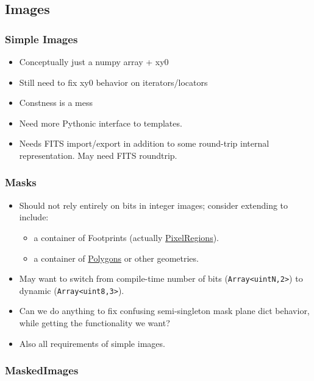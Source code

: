 \subsection{Images}
\label{sec:spImages}

\subsubsection{Simple Images}
\label{sec:spImagesSimple}

\begin{itemize}
\item Conceptually just a numpy array + xy0
\item Still need to fix xy0 behavior on iterators/locators
\item Constness is a mess
\item Need more Pythonic interface to templates.
\item Needs FITS import/export in addition to some round-trip internal representation.  May need FITS roundtrip.
\end{itemize}

\subsubsection{Masks}
\label{sec:spImagesMasks}

\begin{itemize}
\item Should not rely entirely on bits in integer images; consider extending to include:
    \begin{itemize}
    \item a container of Footprints (actually \hyperref[sec:spFootprintsPixelRegions]{PixelRegions}).
    \item a container of \hyperref[sec:spCartesianPolygons]{Polygons} or other geometries.
    \end{itemize}
\item May want to switch from compile-time number of bits (\verb|Array<uintN,2>|) to dynamic (\verb|Array<uint8,3>|).
\item Can we do anything to fix confusing semi-singleton mask plane dict behavior, while getting the functionality we want?
\item Also all requirements of simple images.
\end{itemize}

\subsubsection{MaskedImages}
\label{sec:spImagesMaskedImages}

